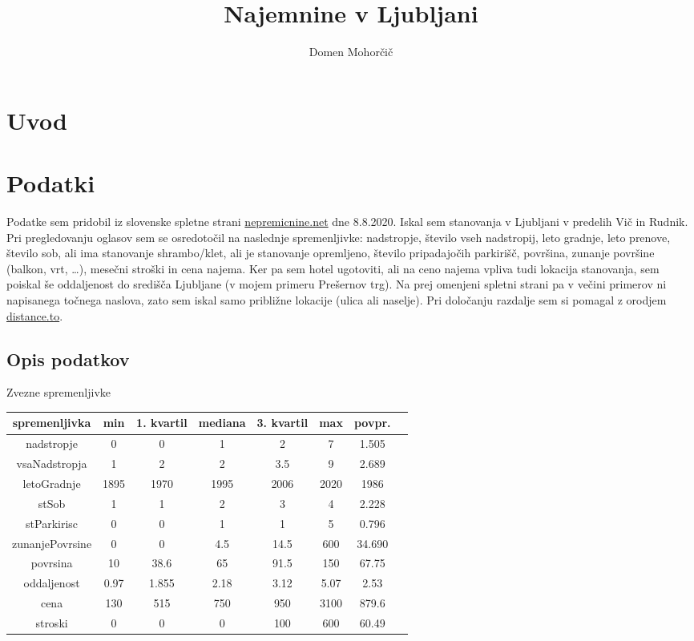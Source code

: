 \documentclass[a4paper, 11pt]{article}
\begin{document}
\title{Najemnine v Ljubljani}
\author{Domen Mohorčič}
\maketitle

\section{Uvod}

\section{Podatki}

Podatke sem pridobil iz slovenske spletne strani
\href{https://www.nepremicnine.net}{nepremicnine.net} dne 8.8.2020.
Iskal sem stanovanja v Ljubljani v predelih Vič in Rudnik.
Pri pregledovanju oglasov sem se osredotočil na naslednje spremenljivke:
nadstropje, število vseh nadstropij, leto gradnje, leto prenove, število sob,
ali ima stanovanje shrambo/klet, ali je stanovanje opremljeno, število
pripadajočih parkirišč, površina, zunanje površine (balkon, vrt, \dots),
mesečni stroški in cena najema. Ker pa sem hotel ugotoviti, ali
na ceno najema vpliva tudi lokacija stanovanja, sem poiskal še oddaljenost
do središča Ljubljane (v mojem primeru Prešernov trg). Na prej omenjeni spletni
strani pa v večini primerov ni napisanega točnega naslova, zato sem iskal samo
približne lokacije (ulica ali naselje). Pri določanju razdalje sem si pomagal
z orodjem \href{https://www.distance.to/}{distance.to}.

\subsection{Opis podatkov}

Zvezne spremenljivke
\begin{center}
\begin{tabular}{ c|c c c c c c c }
	spremenljivka & min & 1. kvartil & mediana & 3. kvartil & max & povpr. \\
	\hline
	nadstropje & 0 & 0 & 1 & 2 & 7 & 1.505 \\
	vsaNadstropja & 1 & 2 & 2 & 3.5 & 9 & 2.689 \\
	letoGradnje & 1895 & 1970 & 1995 & 2006 & 2020 & 1986 \\
	stSob & 1 & 1 & 2 & 3 & 4 & 2.228 \\
	stParkirisc & 0 & 0 & 1 & 1 & 5 & 0.796 \\
	zunanjePovrsine & 0 & 0 & 4.5 & 14.5 & 600 & 34.690 \\
	povrsina & 10 & 38.6 & 65 & 91.5 & 150 & 67.75 \\
	oddaljenost & 0.97 & 1.855 & 2.18 & 3.12 & 5.07 & 2.53 \\
	cena & 130 & 515 & 750 & 950 & 3100 & 879.6 \\
	stroski & 0 & 0 & 0 & 100 & 600 & 60.49 \\
\end{tabular}
\end{center}
\end{document}
